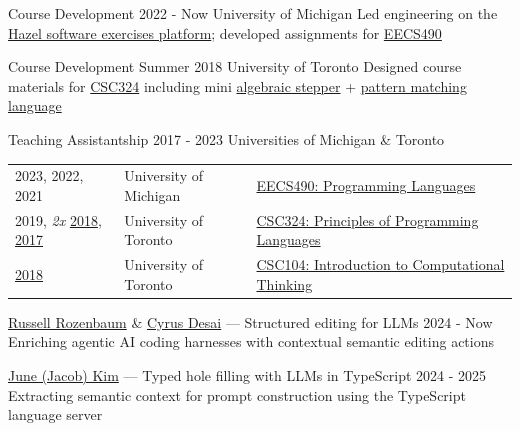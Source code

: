 \documentclass[10pt,a4paper]{article}
\begin{document}

\headedsubsection
{Course Development}
{2022 - Now \sbull University of Michigan}
{
  Led engineering on the \href{https://hazel.org/build/dev}{Hazel software exercises platform}; developed  assignments for \href{https://eecs490.github.io/eecs490.org/}{EECS490}
}

\headedsubsection
{Course Development}
{Summer 2018 \sbull University of Toronto}
{
  Designed course materials for \href{https://artsci.calendar.utoronto.ca/course/csc324h1}{CSC324} including mini \href{https://github.com/disconcision/racketlab/blob/master/choice-stepper.rkt}{algebraic stepper} + \href{https://github.com/disconcision/ductile}{pattern matching language}
}

\headedsubsection
{Teaching Assistantship}
{2017 - 2023 \sbull Universities of Michigan \& Toronto}
{
  \begin{tabular}{p{3.3cm} p{4.1cm}  l}
    2023, 2022, 2021 & University of Michigan &  \href{https://eecs490.github.io/eecs490.org/}{EECS490: Programming Languages} \\
    2019, \emph{2x} \href{https://web.archive.org/web/20190505014200/https://www.cs.toronto.edu/~david/csc324/}{2018}, \href{https://web.archive.org/web/20180104160423/http://www.cs.toronto.edu/~gfb/csc324/2017F}{2017} & University of Toronto &
    \href{https://artsci.calendar.utoronto.ca/course/csc324h1}{CSC324: Principles of Programming Languages} \\
    \href{https://web.archive.org/web/20190115120303/http://www.cs.toronto.edu/~gfb/csc104/2018F/}{2018} & University of Toronto & \href{https://artsci.calendar.utoronto.ca/course/csc104h1}{CSC104: Introduction to Computational Thinking}
  \end{tabular}
}


\headedsubsection
{\href{https://russell-rozenbaum.github.io/PersonalWebsite/}{Russell Rozenbaum} \&
\href{https://www.linkedin.com/in/cyrus-desai-7a8b41200}{Cyrus Desai} --- Structured editing for LLMs}
{2024 - Now}
{Enriching agentic AI coding harnesses with contextual semantic editing actions}

\headedsubsection
{\href{https://jpoly1219.github.io/}{June (Jacob) Kim} --- Typed hole filling with LLMs in TypeScript}
{2024 - 2025}
{Extracting semantic context for prompt construction using the TypeScript language server}
\end{document}
